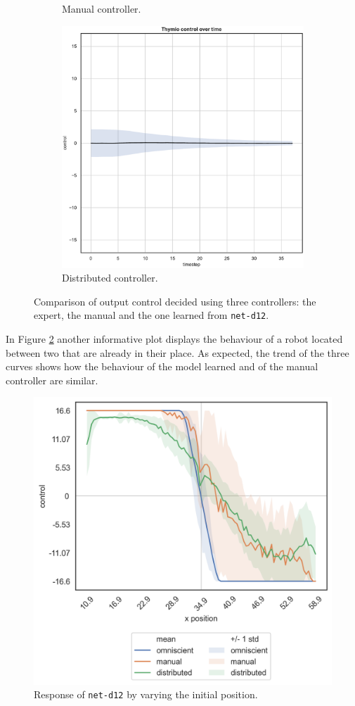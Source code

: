\begin{figure}[!htb]
\begin{subfigure}[h]{0.3\textwidth}
		\caption{Manual controller.}
	\end{subfigure}
	\hfill
	\begin{subfigure}[h]{0.3\textwidth}
		\centering
		\includegraphics[width=\textwidth]{contents/images/net-d12/control-overtime-learned_distributed}
		\caption{Distributed controller.}
	\end{subfigure}
	\caption[Evaluation of the control decided by \texttt{net-d12}.]{Comparison 
		of output control decided using three controllers: the expert, the 
		manual and the one learned from \texttt{net-d12}.}
	\label{fig:net-d12control}
\end{figure}

In Figure \ref{fig:net-d12responseposition} another informative plot displays 
the behaviour of a robot located between two that are already in their place.
As expected, the trend of the three curves shows how the behaviour of the 
model learned and of the manual controller are similar.
\begin{figure}[!htb]
	\centering
	\includegraphics[width=.45\textwidth]{contents/images/net-d12/response-varying_init_position-distributed}%
	\caption{Response of \texttt{net-d12} by varying the initial position.}
	\label{fig:net-d12responseposition}
\end{figure}


